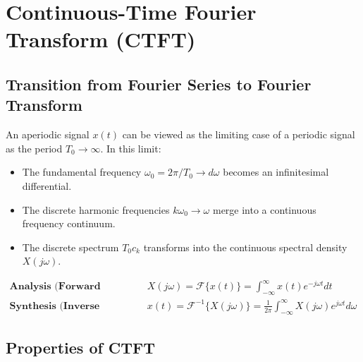 \documentclass[12pt,a4paper]{article}
\begin{document}
\section{Continuous-Time Fourier Transform (CTFT)}

\subsection{Transition from Fourier Series to Fourier Transform}
An aperiodic signal $x(t)$ can be viewed as the limiting case of a periodic signal as the period $T_0 \to \infty$. In this limit:
\begin{itemize}[topsep=2pt, itemsep=2pt]
  \item The fundamental frequency $\omega_0 = 2\pi / T_0 \to d\omega$ becomes an infinitesimal differential.
  \item The discrete harmonic frequencies $k \omega_0 \to \omega$ merge into a continuous frequency continuum.
  \item The discrete spectrum $T_0 c_k$ transforms into the continuous spectral density $X(j\omega)$.
\end{itemize}

\begin{tcolorbox}[formulabox, title={\textbf{The Continuous-Time Fourier Transform (CTFT) Pair}}]
\begin{align}
  \textbf{Analysis (Forward CTFT):} \quad &X(j\omega) = \mathcal{F}\{x(t)\} = \int_{-\infty}^{\infty} x(t) e^{-j\omega t} dt \\
  \textbf{Synthesis (Inverse CTFT):} \quad &x(t) = \mathcal{F}^{-1}\{X(j\omega)\} = \frac{1}{2\pi} \int_{-\infty}^{\infty} X(j\omega) e^{j\omega t} d\omega
\end{align}
\end{tcolorbox}

\subsection{Properties of CTFT}
\end{document}
